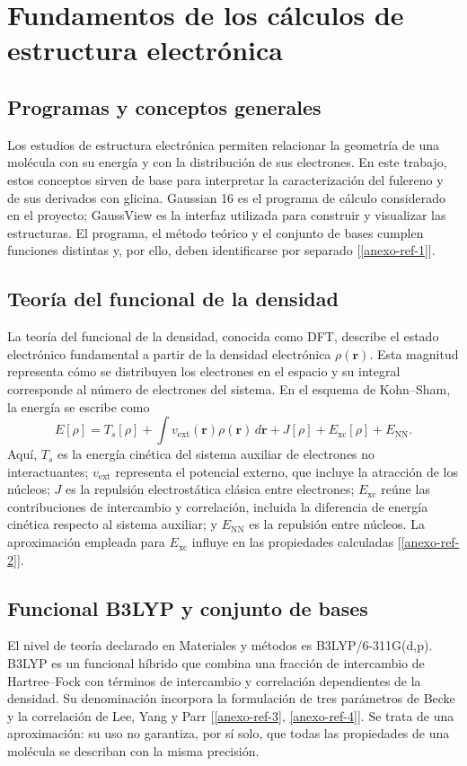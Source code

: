 
\chapter{Fundamentos de los cálculos de estructura electrónica}
\label{ap:fundamentos-gaussian}
\section{Programas y conceptos generales}
Los estudios de estructura electrónica permiten relacionar la geometría de una molécula con su energía y con la distribución de sus electrones. En este trabajo, estos conceptos sirven de base para interpretar la caracterización del fulereno y de sus derivados con glicina. Gaussian 16 es el programa de cálculo considerado en el proyecto; GaussView es la interfaz utilizada para construir y visualizar las estructuras. El programa, el método teórico y el conjunto de bases cumplen funciones distintas y, por ello, deben identificarse por separado [\ref{anexo-ref-1}].

\section{Teoría del funcional de la densidad}
La teoría del funcional de la densidad, conocida como DFT, describe el estado electrónico fundamental a partir de la densidad electrónica $\rho(\mathbf r)$. Esta magnitud representa cómo se distribuyen los electrones en el espacio y su integral corresponde al número de electrones del sistema. En el esquema de Kohn--Sham, la energía se escribe como
\begin{equation}
 E[\rho]=T_s[\rho]+\int v_{\mathrm{ext}}(\mathbf r)\rho(\mathbf r)\,d\mathbf r
 +J[\rho]+E_{\mathrm{xc}}[\rho]+E_{\mathrm{NN}}.
\end{equation}
Aquí, $T_s$ es la energía cinética del sistema auxiliar de electrones no interactuantes; $v_{\mathrm{ext}}$ representa el potencial externo, que incluye la atracción de los núcleos; $J$ es la repulsión electrostática clásica entre electrones; $E_{\mathrm{xc}}$ reúne las contribuciones de intercambio y correlación, incluida la diferencia de energía cinética respecto al sistema auxiliar; y $E_{\mathrm{NN}}$ es la repulsión entre núcleos. La aproximación empleada para $E_{\mathrm{xc}}$ influye en las propiedades calculadas [\ref{anexo-ref-2}].

\section{Funcional B3LYP y conjunto de bases}
El nivel de teoría declarado en Materiales y métodos es B3LYP/6-311G(d,p). B3LYP es un funcional híbrido que combina una fracción de intercambio de Hartree--Fock con términos de intercambio y correlación dependientes de la densidad. Su denominación incorpora la formulación de tres parámetros de Becke y la correlación de Lee, Yang y Parr [\ref{anexo-ref-3}, \ref{anexo-ref-4}]. Se trata de una aproximación: su uso no garantiza, por sí solo, que todas las propiedades de una molécula se describan con la misma precisión.

